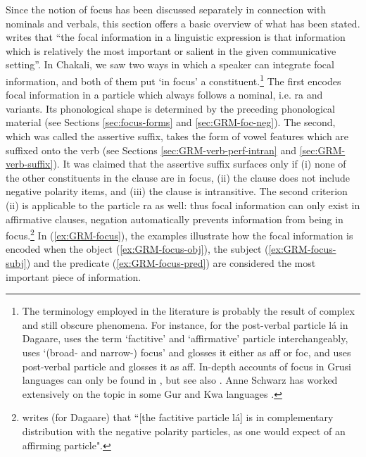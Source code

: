 \begin{exe}
\begin{exe}
\begin{exe}
{\begin{exe}
\begin{exe}
\begin{exe}
\begin{exe}
\begin{exe}
\begin{exe}
\begin{exe}
\begin{exe}
\begin{exe}
\begin{exe}
\begin{exe}
\begin{exe}
\begin{exe}
\begin{exe}
\begin{exe}
\begin{exe}
\begin{exe}
\begin{exe}
\begin{exe}
\begin{exe}
\begin{exe}
Since the notion of focus has been discussed separately in connection with
nominals and verbals, this section offers a basic overview of what has been
stated.  \citet[326]{Dik97} writes that   ``the focal information in a
linguistic expression is
that
information which is relatively the most important or salient in the given
communicative setting''.  In Chakali, we saw  two ways in which a
speaker can integrate focal information, and both of them put `in focus' a
constituent.\footnote{The  terminology employed in the literature is probably
the result
of  complex and still obscure phenomena. For instance, for the
post-verbal particle {\sls lá} in Dagaare, \citet{Bodo97} uses the term
`factitive' and `affirmative' particle interchangeably, \citet{Daku05} uses
`(broad- and narrow-)  focus' and glosses it either as {\sc aff} or {\sc foc},
and
\citet{Saan03} uses post-verbal particle and glosses it as {\sc aff}. In-depth
accounts of focus in Grusi languages can only be found in \citet{blas90}, 
but see also \citet{Mcgi99}.
 Anne Schwarz has worked extensively on the topic in some Gur and Kwa
languages \citep{Schw10}.}   The first
encodes focal information in a particle which  always
 follows a nominal, i.e. {\sls ra} and variants. Its  phonological shape is
determined by the
preceding phonological material (see Sections \ref{sec:focus-forms} and 
\ref{sec:GRM-foc-neg}). The second, which was called the assertive suffix, takes
the form of vowel features which
are suffixed onto the verb  (see Sections \ref{sec:GRM-verb-perf-intran} and 
\ref{sec:GRM-verb-suffix}). It was claimed that  the assertive suffix surfaces
only if (i) none of the other constituents in the
clause are in focus, (ii) the clause does not include negative polarity items,
and (iii) the clause is intransitive.
The second criterion (ii) is applicable to the particle {\sls ra} as well: thus
focal
information can only exist in affirmative clauses, negation automatically
prevents information from being in focus.\footnote{\citet[94]{Bodo97} writes
(for
Dagaare) that
``[the factitive particle {\sls lá}] is in complementary distribution with the
negative polarity particles, as one would expect of an affirming particle".}  In
 (\ref{ex:GRM-focus}),  the
examples illustrate  how the  focal information is
encoded when the object (\ref{ex:GRM-focus-obj}), the subject
(\ref{ex:GRM-focus-subj}) and the predicate  (\ref{ex:GRM-focus-pred}) are
considered the most important piece of information. 


\ea\label{ex:GRM-focus}


\end{exe}
\end{exe}
\end{exe}
\end{exe}
\end{exe}
\end{exe}
\end{exe}
\end{exe}
\end{exe}
\end{exe}
\end{exe}
\end{exe}
\end{exe}
\end{exe}
\end{exe}
\end{exe}
\end{exe}
\end{exe}
\end{exe}
\end{exe}
\end{exe}}
\end{exe}
\end{exe}
\end{exe}
